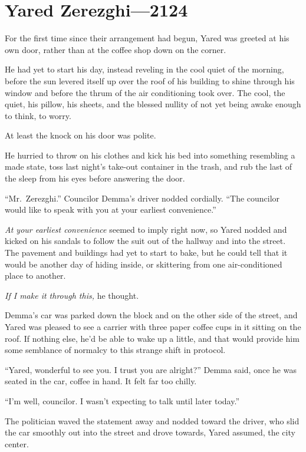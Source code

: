 \hypertarget{yared-zerezghi-2124}{%
\chapter{Yared Zerezghi---2124}\label{yared-zerezghi-2124}}

For the first time since their arrangement had begun, Yared was greeted at his own door, rather than at the coffee shop down on the corner.

He had yet to start his day, instead reveling in the cool quiet of the morning, before the sun levered itself up over the roof of his building to shine through his window and before the thrum of the air conditioning took over. The cool, the quiet, his pillow, his sheets, and the blessed nullity of not yet being awake enough to think, to worry.

At least the knock on his door was polite.

He hurried to throw on his clothes and kick his bed into something resembling a made state, toss last night's take-out container in the trash, and rub the last of the sleep from his eyes before answering the door.

``Mr.~Zerezghi.'' Councilor Demma's driver nodded cordially. ``The councilor would like to speak with you at your earliest convenience.''

\emph{At your earliest convenience} seemed to imply right now, so Yared nodded and kicked on his sandals to follow the suit out of the hallway and into the street. The pavement and buildings had yet to start to bake, but he could tell that it would be another day of hiding inside, or skittering from one air-conditioned place to another.

\emph{If I make it through this,} he thought.

Demma's car was parked down the block and on the other side of the street, and Yared was pleased to see a carrier with three paper coffee cups in it sitting on the roof. If nothing else, he'd be able to wake up a little, and that would provide him some semblance of normalcy to this strange shift in protocol.

``Yared, wonderful to see you. I trust you are alright?'' Demma said, once he was seated in the car, coffee in hand. It felt far too chilly.

``I'm well, councilor. I wasn't expecting to talk until later today.''

The politician waved the statement away and nodded toward the driver, who slid the car smoothly out into the street and drove towards, Yared assumed, the city center.

